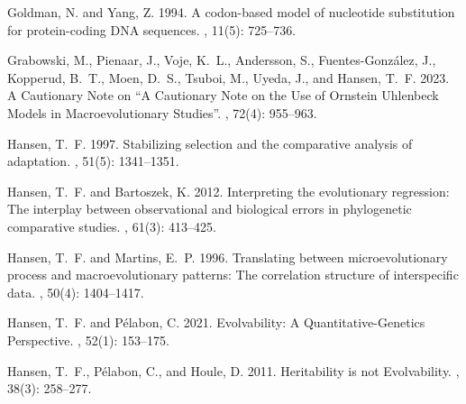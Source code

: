 \documentclass{article}
\begin{document}
\begin{thebibliography}{}
    Goldman, N. and Yang, Z. 1994.
    \newblock A codon-based model of nucleotide substitution for protein-coding
        {{DNA}} sequences.
    , {11}(5): 725--736.

    Grabowski, M., Pienaar, J., Voje, K.~L., Andersson, S., {Fuentes-Gonz{\'a}lez},
    J., Kopperud, B.~T., Moen, D.~S., Tsuboi, M., Uyeda, J., and Hansen, T.~F.
    2023.
    \newblock A {{Cautionary Note}} on ``{{A Cautionary Note}} on the {{Use}} of
        {{Ornstein Uhlenbeck Models}} in {{Macroevolutionary Studies}}''.
    , {72}(4): 955--963.

    Hansen, T.~F. 1997.
    \newblock Stabilizing selection and the comparative analysis of adaptation.
    , {51}(5): 1341--1351.

    Hansen, T.~F. and Bartoszek, K. 2012.
    \newblock Interpreting the evolutionary regression: The interplay between
    observational and biological errors in phylogenetic comparative studies.
    , {61}(3): 413--425.

    Hansen, T.~F. and Martins, E.~P. 1996.
    \newblock Translating between microevolutionary process and macroevolutionary
    patterns: The correlation structure of interspecific data.
    , {50}(4): 1404--1417.

    Hansen, T.~F. and P{\'e}labon, C. 2021.
    \newblock Evolvability: {{A Quantitative-Genetics Perspective}}.
    ,
        {52}(1): 153--175.

    Hansen, T.~F., P{\'e}labon, C., and Houle, D. 2011.
    \newblock Heritability is not {{Evolvability}}.
    , {38}(3): 258--277.


\end{thebibliography}
\end{document}
